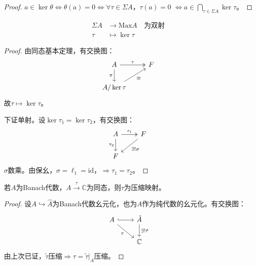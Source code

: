 \documentclass[lang=cn,a4paper,newtx,section]{elegantbook}
\begin{document}
\begin{proof}
  $a \in \ker\theta \Longleftrightarrow \theta(a) = 0 \Longleftrightarrow \forall \tau \in \Sigma A$，$\tau(a) = 0$
  $\Longleftrightarrow a \in \bigcap_{\tau \in \Sigma A}\ker\tau$。
\end{proof}

\begin{proposition}
  \begin{equation*}
    \begin{aligned}
      \Sigma A &\longrightarrow \mathrm{Max}A \quad \text{为双射} \\
      \tau &\longmapsto \ker\tau
    \end{aligned}
  \end{equation*}
\end{proposition}

\begin{proof}
  由同态基本定理，有交换图：
  \begin{equation*}
    \begin{tikzcd}
      A \arrow[r, "\tau", two heads] \arrow[d, "\pi"'] & F \\
      A/\ker\tau \arrow[ur, "\cong"'] &
    \end{tikzcd}
  \end{equation*}
  故$\tau \longmapsto \ker\tau$。
  
  下证单射。设$\ker\tau_1 = \ker\tau_2$，有交换图：
  \begin{equation*}
    \begin{tikzcd}
      A \arrow[r, "\tau_1", two heads] \arrow[d, "\tau_2"'] & F \arrow[dl, "\exists! \sigma"] \\
      F &
    \end{tikzcd}
  \end{equation*}
  $\sigma$数乘。由保幺，$\sigma = \ell_1 = \mathrm{id}$，$\Rightarrow \tau_1 = \tau_2$。
\end{proof}

\begin{proposition}
  若$A$为Banach代数，$A \xrightarrow{\tau} \mathbb{C}$为同态，则$\tau$为压缩映射。
\end{proposition}

\begin{proof}
  设$A \hookrightarrow \hat{A}$为Banach代数幺元化，也为$A$作为纯代数的幺元化。有交换图：
  \begin{equation*}
    \begin{tikzcd}
      A \arrow[r, hook] \arrow[rd, "\tau"'] & \hat{A} \arrow[d, "\exists! \tilde{\tau}"] \\
      & \mathbb{C}
    \end{tikzcd}
  \end{equation*}
  由上次已证，$\tilde{\tau}$压缩$\Rightarrow \tau = \tilde{\tau}|_A$压缩。
\end{proof}
\end{document}
